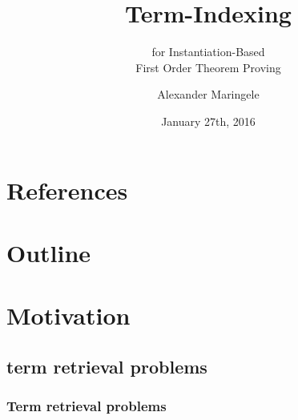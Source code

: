 \documentclass[ 
xcolor={usenames,dvipsnames,svgnames,tablem} 
,handout
]{beamer}
\author{Alexander Maringele}
\title{Term-Indexing
}
\subtitle{for Instantiation-Based\\First Order Theorem Proving}
\date{January 27th, 2016}
\begin{document}


\frame[<+->]{
\maketitle
}

\section*{References}



\section*{Outline}
\setcounter{tocdepth}{1}




%

\section{Motivation}






\subsection{term retrieval problems}
\begin{frame}
\frametitle{Term retrieval problems}

\end{frame}


%
%
\end{document}
